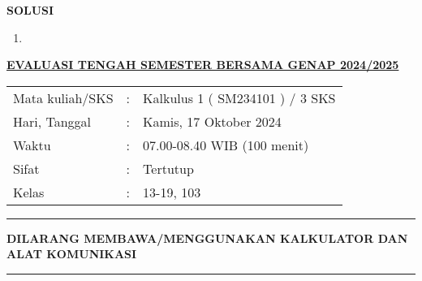\documentclass[10pt,openany,a4paper]{article}
\renewcommand{\headrulewidth}{0pt}
\renewcommand{\footrulewidth}{0pt}
\begin{document}


\newpage
{}
{\centering\textbf{SOLUSI}}
\renewcommand{\arraystretch}{1.5}
\renewcommand{\headrulewidth}{1pt}
\begin{enumerate}
    \item
\end{enumerate}

\newpage
\renewcommand{\arraystretch}{1}
\fancyhead{}
\fancyfoot{}
\fancyhead[r]{}
\renewcommand{\headrulewidth}{0pt}
\renewcommand{\footrulewidth}{0pt}
\begin{center}
    {\underline{\textbf{\MakeUppercase{Evaluasi Tengah Semester Bersama Genap 2024/2025}}}}
\end{center}

\begin{center}
    \begin{tabular}{lcl}
        Mata kuliah/SKS & : & Kalkulus 1 ( SM234101 ) / 3 SKS \\
        Hari, Tanggal   & : & Kamis, 17 Oktober 2024          \\
        Waktu           & : & 07.00-08.40 WIB (100 menit)     \\
        Sifat           & : & Tertutup                        \\
        Kelas           & : & 13-19, 103
    \end{tabular}
\end{center}

\noindent\rule{\textwidth}{2.pt}

\setlength{\parindent}{5pt}
\setlength{\parindent}{5pt}
\setlength{\parindent}{5pt}
\par \textbf{\MakeUppercase{dilarang membawa/menggunakan kalkulator dan alat komunikasi}}
\par {}
\noindent\rule{\textwidth}{2.pt}
\end{document}
